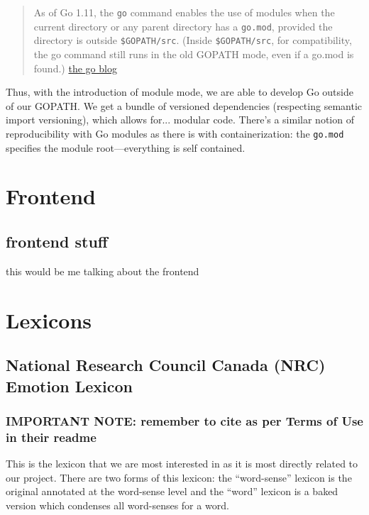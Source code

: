 \documentclass[11pt, twoside, reqno]{book}
\begin{document}
\begin{quote}
As of Go 1.11, the \texttt{go} command enables the use of modules when the current directory or any parent directory has a \texttt{go.mod}, provided the directory is outside \texttt{\$GOPATH/src}. (Inside \texttt{\$GOPATH/src}, for compatibility, the go command still runs in the old GOPATH mode, even if a go.mod is found.) \href{https://blog.golang.org/using-go-modules}{the go blog}
\end{quote}

Thus, with the introduction of module mode, we are able to develop Go outside of our GOPATH. We get a bundle of versioned dependencies (respecting semantic import versioning), which allows for... modular code. There's a similar notion of reproducibility with Go modules as there is with containerization: the \texttt{go.mod} specifies the module root—everything is self contained.


\chapter{Frontend}




\section{frontend stuff}

this would be me talking about the frontend

\chapter{Lexicons}



\section{National Research Council Canada (NRC) Emotion Lexicon}

\subsection{IMPORTANT NOTE: remember to cite as per Terms of Use in their readme}

This is the lexicon that we are most interested in as it is most directly related to our project. There are two forms of this lexicon: the ``word-sense'' lexicon is the original annotated at the word-sense level and the ``word'' lexicon is a baked version which condenses all word-senses for a word.
\end{document}
